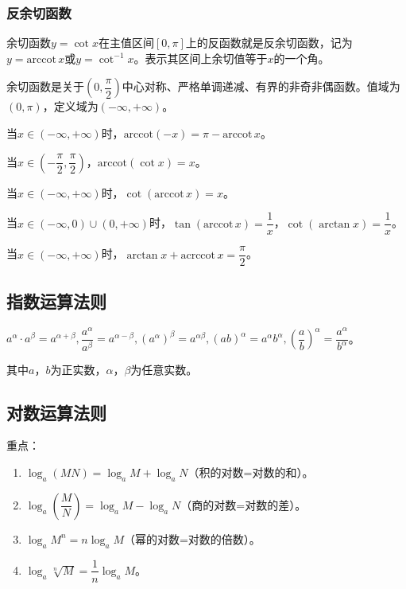 \documentclass[UTF8, 12pt]{ctexart}
\begin{document}
        \subsubsection{反余切函数}

        余切函数$y=\cot x$在主值区间$[0,\pi]$上的反函数就是反余切函数，记为$y=\textrm{arccot}\,x$或$y=\cot^{-1}x$。表示其区间上余切值等于$x$的一个角。

        余切函数是关于$\left(0,\dfrac{\pi}{2}\right)$中心对称、严格单调递减、有界的非奇非偶函数。值域为$(0,\pi)$，定义域为$(-\infty,+\infty)$。

        当$x\in(-\infty,+\infty)$时，$\textrm{arccot}(-x)=\pi-\textrm{arccot}\,x$。

        当$x\in\left(-\dfrac{\pi}{2},\dfrac{\pi}{2}\right)$，$\textrm{arccot}(\cot x)=x$。

        当$x\in(-\infty,+\infty)$时，$\cot(\textrm{arccot}\,x)=x$。

        当$x\in(-\infty,0)\cup(0,+\infty)$时，$\tan(\textrm{arccot}\,x)=\dfrac{1}{x}$，$\cot(\arctan x)=\dfrac{1}{x}$。

        当$x\in(-\infty,+\infty)$时，$\arctan x+\textrm{acrccot}\,x=\dfrac{\pi}{2}$。

        \subsection{指数运算法则}

        $a^\alpha\cdot a^\beta=a^{\alpha+\beta},\dfrac{a^\alpha}{a^\beta}=a^{\alpha-\beta},(a^\alpha)^\beta=a^{\alpha\beta},(ab)^\alpha=a^\alpha b^\alpha,(\dfrac{a}{b})^\alpha=\dfrac{a^\alpha}{b^\alpha}$。

        其中$a$，$b$为正实数，$\alpha$，$\beta$为任意实数。

        \subsection{对数运算法则}

        重点：

        \begin{enumerate}
            \item $\log_a(MN)=\log_aM+\log_aN$（积的对数=对数的和）。
            \item $\log_a(\dfrac{M}{N})=\log_aM-\log_aN$（商的对数=对数的差）。
            \item $\log_aM^n=n\log_aM$（幂的对数=对数的倍数）。
            \item $\log_a\sqrt[n]{M}=\dfrac{1}{n}\log_aM$。
        \end{enumerate}
\end{document}
